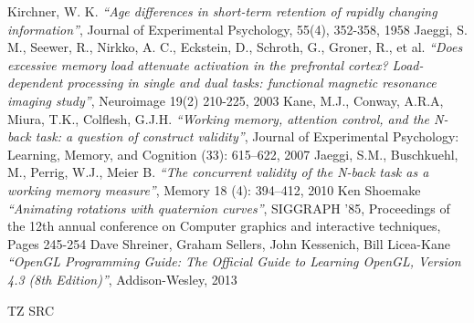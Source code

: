 \documentclass[russian,ukrainian,utf8,simple]{eskdtext}
\begin{document}
\tableofcontents
\newpage
\begin{thebibliography}{99}
  Kirchner, W. K.
  \emph{``Age differences in short-term retention of rapidly changing information''},
  Journal of Experimental Psychology, 55(4), 352-358,
  1958
  Jaeggi, S. M., Seewer, R., Nirkko, A. C., Eckstein, D., Schroth, G., Groner, R., et al.
  \emph{``Does excessive memory load attenuate activation in the prefrontal cortex? Load-dependent processing in single and dual tasks: functional magnetic resonance imaging study''},
  Neuroimage 19(2) 210-225,
  2003
  Kane, M.J., Conway, A.R.A, Miura, T.K., Colflesh, G.J.H.
  \emph{``Working memory, attention control, and the N-back task: a question of construct validity''},
  Journal of Experimental Psychology: Learning, Memory, and Cognition (33): 615–622,
  2007
  Jaeggi, S.M., Buschkuehl, M., Perrig, W.J., Meier B.
  \emph{``The concurrent validity of the N-back task as a working memory measure''},
  Memory 18 (4): 394–412,
  2010
  Ken Shoemake
  \emph{``Animating rotations with quaternion curves''},
  SIGGRAPH '85,
  Proceedings of the 12th annual conference on Computer graphics and interactive techniques,
  Pages 245-254
  Dave Shreiner, Graham Sellers, John Kessenich, Bill Licea-Kane
  \emph{``OpenGL Programming Guide: The Official Guide to Learning OpenGL, Version 4.3 (8th Edition)''},
  Addison-Wesley,
  2013
\end{thebibliography}
TZ
SRC
\end{document}
